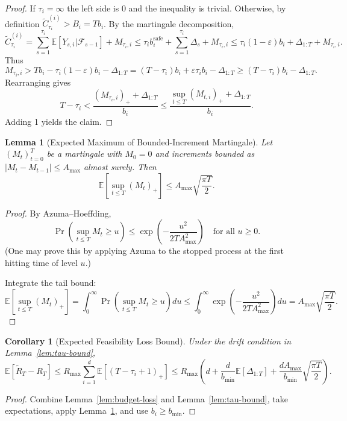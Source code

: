 \documentclass[11pt]{article}
\newtheorem{lemma}[theorem]{Lemma}
\newtheorem{corollary}[theorem]{Corollary}
\newcommand{\E}{\mathbb{E}}
\newcommand{\cF}{\mathcal{F}}
\begin{document}
\begin{proof}
If $\tau_i = \infty$ the left side is 0 and the inequality is trivial. Otherwise, by definition $\tilde{C}_{\tau_i}^{(i)} > B_i = T b_i$. By the martingale decomposition,
\[
\tilde{C}_{\tau_i}^{(i)} = \sum_{s=1}^{\tau_i} \E[Y_{s,i} | \cF_{s-1}] + M_{\tau_i,i} \le \tau_i b^{\mathrm{safe}}_i + \sum_{s=1}^{\tau_i} \Delta_s + M_{\tau_i,i} \le \tau_i (1-\varepsilon) b_i + \Delta_{1:T} + M_{\tau_i,i}.
\]
Thus
\[
M_{\tau_i,i} > T b_i - \tau_i (1-\varepsilon) b_i - \Delta_{1:T} = (T - \tau_i) b_i + \varepsilon \tau_i b_i - \Delta_{1:T} \ge (T - \tau_i) b_i - \Delta_{1:T}.
\]
Rearranging gives
\[
T - \tau_i < \frac{(M_{\tau_i,i})_+ + \Delta_{1:T}}{b_i} \le \frac{\sup_{t \le T} (M_{t,i})_+ + \Delta_{1:T}}{b_i}.
\]
Adding 1 yields the claim.
\end{proof}

\begin{lemma}[Expected Maximum of Bounded-Increment Martingale]
\label{lem:mart-max}
Let $(M_t)_{t=0}^T$ be a martingale with $M_0 = 0$ and increments bounded as $|M_t - M_{t-1}| \le A_{\max}$ almost surely. Then
\[
\E\left[\sup_{t \le T} (M_t)_+\right] \le A_{\max} \sqrt{\frac{\pi T}{2}}.
\]
\end{lemma}

\begin{proof}
By Azuma--Hoeffding,
\[
\Pr\left(\sup_{t \le T} M_t \ge u\right) \le \exp\left(-\frac{u^2}{2 T A_{\max}^2}\right) \quad \text{for all } u \ge 0.
\]
(One may prove this by applying Azuma to the stopped process at the first hitting time of level $u$.)

Integrate the tail bound:
\[
\E\left[\sup_{t \le T} (M_t)_+\right] = \int_0^\infty \Pr\left(\sup_{t \le T} M_t \ge u\right) du \le \int_0^\infty \exp\left(-\frac{u^2}{2 T A_{\max}^2}\right) du = A_{\max} \sqrt{\frac{\pi T}{2}}.
\]
\end{proof}

\begin{corollary}[Expected Feasibility Loss Bound]
\label{cor:feas-loss}
Under the drift condition in Lemma~\ref{lem:tau-bound},
\[
\E[\tilde{R}_T - R_T] \le R_{\max} \sum_{i=1}^d \E[(T - \tau_i + 1)_+] \le R_{\max} \left( d + \frac{d}{b_{\min}} \E[\Delta_{1:T}] + \frac{d A_{\max}}{b_{\min}} \sqrt{\frac{\pi T}{2}} \right).
\]
\end{corollary}

\begin{proof}
Combine Lemma~\ref{lem:budget-loss} and Lemma~\ref{lem:tau-bound}, take expectations, apply Lemma~\ref{lem:mart-max}, and use $b_i \ge b_{\min}$.
\end{proof}
\end{document}
